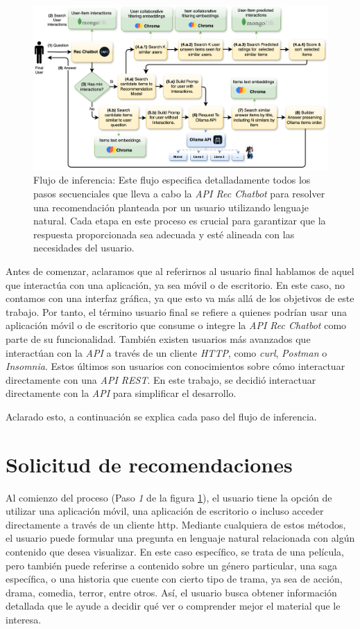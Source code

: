 \documentclass[11pt,a4paper,twoside]{thesis}
\begin{document}
\begin{figure}[H]
	\centering
	\label{fig:inference-flow}
	\includegraphics[width=12.5cm]{./images/inference.flow.png}
	\caption{Flujo de inferencia: Este flujo especifica detalladamente todos los pasos secuenciales que lleva a cabo la \textit{API Rec Chatbot} para resolver una recomendación planteada por un usuario utilizando lenguaje natural. Cada etapa en este proceso es crucial para garantizar que la respuesta proporcionada sea adecuada y esté alineada con las necesidades del usuario.}
\end{figure}


Antes de comenzar, aclaramos que al referirnos al usuario final hablamos de aquel que interactúa con una aplicación, ya sea móvil o de escritorio. En este caso, no contamos con una interfaz gráfica, ya que esto va más allá de los objetivos de este trabajo. Por tanto, el término usuario final se refiere a quienes podrían usar una aplicación móvil o de escritorio que consume o integre la \textit{API Rec Chatbot} como parte de su funcionalidad. También existen usuarios más avanzados que interactúan con la \textit{API} a través de un cliente \textit{HTTP}, como \textit{curl}, \textit{Postman} o \textit{Insomnia}. Estos últimos son usuarios con conocimientos sobre cómo interactuar directamente con una \textit{API REST}. En este trabajo, se decidió interactuar directamente con la \textit{API} para simplificar el desarrollo.

Aclarado esto, a continuación se explica cada paso del flujo de inferencia.


\section{Solicitud de recomendaciones}

Al comienzo del proceso (Paso \textit{1} de la figura \ref{fig:inference-flow}), el usuario tiene la opción de utilizar una aplicación móvil, una aplicación de escritorio o incluso acceder directamente a través de un cliente http. Mediante cualquiera de estos métodos, el usuario puede formular una pregunta en lenguaje natural relacionada con algún contenido que desea visualizar. En este caso específico, se trata de una película, pero también puede referirse a contenido sobre un género particular, una saga específica, o una historia que cuente con cierto tipo de trama, ya sea de acción, drama, comedia, terror, entre otros. Así, el usuario busca obtener información detallada que le ayude a decidir qué ver o comprender mejor el material que le interesa.
\end{document}
